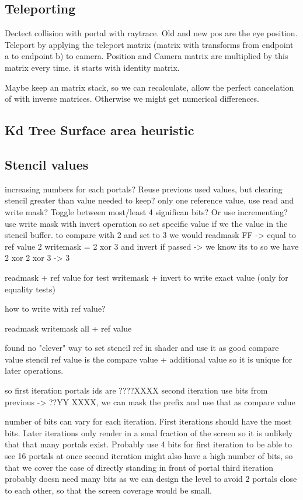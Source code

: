 \subsection{Teleporting}
Dectect collision with portal with raytrace. Old and new pos are the eye position.
Teleport by applying the teleport matrix (matrix with transforms from endpoint a to endpoint b) to camera. Position and Camera matrix are multiplied by this matrix every time. it starts with identity matrix.

Maybe keep an matrix stack, so we can recalculate, allow the perfect cancelation of with inverse matrices. Otherwise we might get numerical differences.

\subsection{Kd Tree Surface area heuristic}
\cite{ macdonald:1990:heuristics}
\subsection{Stencil values}
increasing numbers for each portals?
Reuse previous used values, but clearing stencil greater than value needed to keep?
only one reference value, use read and write mask? Toggle between most/least 4 significan bits? Or use incrementing?
use write mask with invert operation so set specific value if we the value in the stencil buffer.
to compare with 2 and set to 3 we would
readmask FF -> equal to ref value 2
writemask = 2 xor 3 and invert if passed -> we know its to so we have 2 xor 2 xor 3 -> 3

readmask + ref value for test
writemask + invert to write exact value (only for equality tests)

how to write with ref value?

readmask
writemask all + ref value

found no "clever" way to set stencil ref in shader and use it as good compare value
stencil ref value is the compare value + additional value so it is unique for later operations.

so first iteration portals ids are ????XXXX
second iteration use bits from previous -> ??YY XXXX, we can mask the prefix and use that as compare value

number of bits can vary for each iteration. First iterations should have the most bits. Later iterations only render in a smal fraction of the screen so it is unlikely that that many portals exist.
Probably use 4 bits for first iteration to be able to see 16 portals at once
second iteration might also have a high number of bits, so that we cover the case of directly standing in front of portal
third iteration probably doesn need many bits as we can design the level to avoid 2 portals close to each other, so that the screen coverage would be small.

